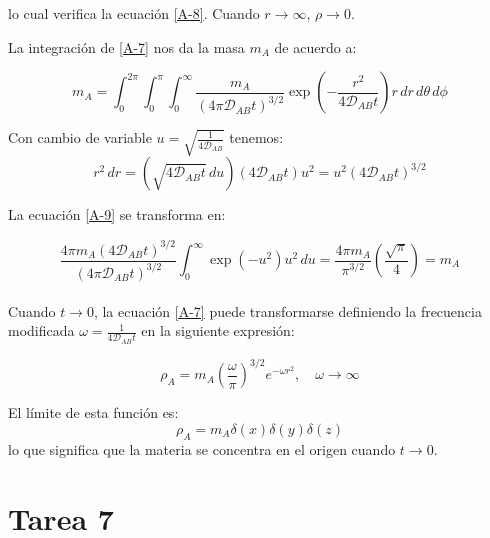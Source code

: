lo cual verifica la ecuación \eqref{A-8}. Cuando \( r \to \infty \), \( \rho \to 0 \).

La integración de \eqref{A-7} nos da la masa \( m_A \) de acuerdo a:

    \[
        m_A = \int_0^{2\pi}\int_0^\pi\int_{0}^{\infty} \frac{m_A}{(4\pi \mathscr{D}_{AB} t)^{3/2}} \exp \left( -\frac{r^2}{4 \mathscr{D}_{AB} t} \right) r \, dr \, d\theta \, d\phi
    \tag{A-8}
    \label{A-9}
    \]

Con cambio de variable \(u=\sqrt{\frac{1}{4\mathscr{D}_{AB}}}\) tenemos:
    \[
     r^2 \, dr = (\sqrt{4 \mathscr{D}_{AB} t} \, du) \left( 4 \mathscr{D}_{AB} t  \right)u^2=u^2\left( 4 \mathscr{D}_{AB}t\right)^{3/2}
    \]

La ecuación \eqref{A-9} se transforma en:

    \[
        \frac{4\pi m_A (4 \mathscr{D}_{AB} t)^{3/2}}{(4 \pi \mathscr{D}_{AB} t)^{3/2}} \int_{0}^{\infty} \exp(-u^2) u^2 \, du = 
        \frac{4\pi m_A}{\pi^{3/2}} \left(\frac{\sqrt{\pi}}{4}\right) = m_A
    \]
    \\
Cuando \( t \to 0 \), la ecuación \eqref{A-7} puede transformarse definiendo la frecuencia modificada $\omega = \frac{1}{4 \mathscr{D}_{AB} t}$ en la siguiente expresión:

    \[
        \rho_A = m_A \left( \frac{\omega}{\pi} \right)^{3/2} e^{-\omega r^2}, \quad \omega \to \infty
    \]

El límite de esta función es:
    \[
        \rho_A = m_A \delta(x) \delta(y) \delta(z)
        \tag{A-10}
        \label{A-10}
    \]
lo que significa que la materia se concentra en el origen cuando \( t \to 0 \).
\newpage
\section{Tarea 7}

